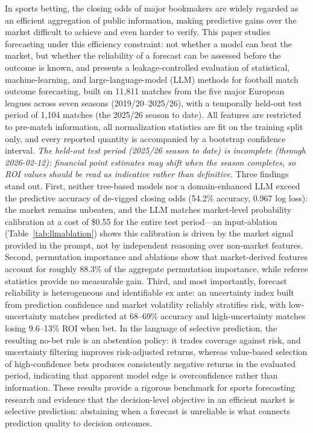 In sports betting, the closing odds of major bookmakers are widely
regarded as an efficient aggregation of public information, making
predictive gains over the market difficult to achieve and even harder
to verify. This paper studies forecasting under this efficiency
constraint: not whether a model can beat the market, but whether the
reliability of a forecast can be assessed before the outcome is
known, and presents a leakage-controlled evaluation of statistical,
machine-learning, and large-language-model (LLM) methods for football
match outcome forecasting, built on 11,811 matches from the five
major European leagues across seven seasons (2019/20--2025/26), with
a temporally held-out test period of 1,104 matches (the 2025/26
season to date). All features are restricted
to pre-match information, all normalization statistics are fit on the
training split only, and every reported quantity is accompanied by a
bootstrap confidence interval. \emph{The held-out test period
(2025/26 season to date) is incomplete (through 2026-02-12):
financial point estimates may shift when the season completes, so ROI
values should be read as indicative rather than definitive.} Three
findings stand out. First,
neither tree-based models nor a domain-enhanced LLM exceed the
predictive accuracy of de-vigged closing odds (54.2\% accuracy,
0.967 log loss): the market remains unbeaten, and the LLM matches
market-level probability calibration at a cost of \$0.55 for the
entire test period---an input-ablation (Table~\ref{tab:llmablation})
shows this calibration is driven by the market signal provided in
the prompt, not by independent reasoning over non-market features.
Second, permutation importance and ablations
show that market-derived features account for roughly 88.3\% of the
aggregate permutation importance, while referee statistics provide no measurable gain.
Third, and most importantly, forecast reliability is heterogeneous
and identifiable ex ante: an uncertainty index built from
prediction confidence and market volatility reliably stratifies
risk, with low-uncertainty matches predicted at 68--69\% accuracy
and high-uncertainty matches losing 9.6--13\% ROI when bet. In the
language of selective prediction, the resulting no-bet rule is an
abstention policy: it trades coverage against risk, and uncertainty
filtering improves risk-adjusted returns, whereas value-based
selection of high-confidence bets produces consistently negative
returns in the evaluated period, indicating that apparent model edge
is overconfidence rather than information. These results provide a
rigorous benchmark for sports forecasting research and evidence that
the decision-level objective in an efficient market is selective
prediction: abstaining when a forecast is unreliable is what connects
prediction quality to decision outcomes.
